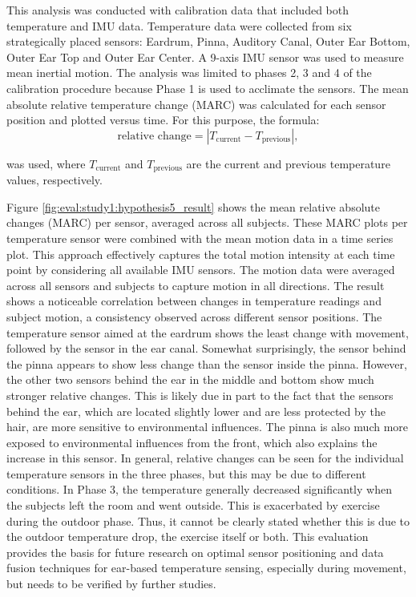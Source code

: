 This analysis was conducted with calibration data that included both temperature and IMU data. 
Temperature data were collected from six strategically placed sensors: Eardrum, Pinna, Auditory Canal, Outer Ear Bottom, Outer Ear Top and Outer Ear Center.
A 9-axis IMU sensor was used to measure mean inertial motion. 
The analysis was limited to phases 2, 3 and 4 of the calibration procedure because Phase 1 is used to acclimate the sensors.
The mean absolute relative temperature change (MARC) was calculated for each sensor position and plotted versus time.
For this purpose, the formula:
\[
\text{relative change} = \left| T_{\text{current}} - T_{\text{previous}} \right|,
\]

was used, where \( T_{\text{current}} \) and \( T_{\text{previous}} \) are the current and previous temperature values, respectively. 

Figure \ref{fig:eval:study1:hypothesis5_result} shows the mean relative absolute changes (MARC) per sensor, averaged across all subjects.
These MARC plots per temperature sensor were combined with the mean motion data in a time series plot.
This approach effectively captures the total motion intensity at each time point by considering all available IMU sensors.
The motion data were averaged across all sensors and subjects to capture motion in all directions.
The result shows a noticeable correlation between changes in temperature readings and subject motion, a consistency observed across different sensor positions.
The temperature sensor aimed at the eardrum shows the least change with movement, followed by the sensor in the ear canal.
Somewhat surprisingly, the sensor behind the pinna appears to show less change than the sensor inside the pinna. 
However, the other two sensors behind the ear in the middle and bottom show much stronger relative changes. 
This is likely due in part to the fact that the sensors behind the ear, which are located slightly lower and are less protected by the hair, are more sensitive to environmental influences. 
The pinna is also much more exposed to environmental influences from the front, which also explains the increase in this sensor.
In general, relative changes can be seen for the individual temperature sensors in the three phases, but this may be due to different conditions. 
In Phase 3, the temperature generally decreased significantly when the subjects left the room and went outside.
This is exacerbated by exercise during the outdoor phase. 
Thus, it cannot be clearly stated whether this is due to the outdoor temperature drop, the exercise itself or both.
This evaluation provides the basis for future research on optimal sensor positioning and data fusion techniques for ear-based temperature sensing, especially during movement, but needs to be verified by further studies.

